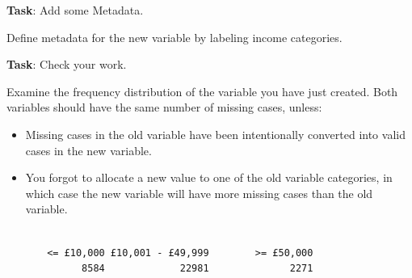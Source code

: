 \documentclass[
  letterpaper,
  DIV=11,
  numbers=noendperiod]{scrreprt}
\newenvironment{Shaded}{\begin{snugshade}}{\end{snugshade}}
\newcommand{\AttributeTok}[1]{\textcolor[rgb]{0.40,0.45,0.13}{#1}}
\newcommand{\CommentTok}[1]{\textcolor[rgb]{0.37,0.37,0.37}{#1}}
\newcommand{\FunctionTok}[1]{\textcolor[rgb]{0.28,0.35,0.67}{#1}}
\newcommand{\NormalTok}[1]{\textcolor[rgb]{0.00,0.23,0.31}{#1}}
\newcommand{\OtherTok}[1]{\textcolor[rgb]{0.00,0.23,0.31}{#1}}
\newcommand{\SpecialCharTok}[1]{\textcolor[rgb]{0.37,0.37,0.37}{#1}}
\newcommand{\StringTok}[1]{\textcolor[rgb]{0.13,0.47,0.30}{#1}}
\providecommand{\tightlist}{%
  \setlength{\itemsep}{0pt}\setlength{\parskip}{0pt}}
\begin{document}
\textbf{Task}: Add some Metadata.

Define metadata for the new variable by labeling income categories.

\begin{Shaded}
\end{Shaded}

\textbf{Task}: Check your work.

Examine the frequency distribution of the variable you have just
created. Both variables should have the same number of missing cases,
unless:

\begin{itemize}
\tightlist
\item
  Missing cases in the old variable have been intentionally converted
  into valid cases in the new variable.
\item
  You forgot to allocate a new value to one of the old variable
  categories, in which case the new variable will have more missing
  cases than the old variable.
\end{itemize}

\begin{Shaded}
\end{Shaded}

\begin{verbatim}

       <= £10,000 £10,001 - £49,999        >= £50,000 
             8584             22981              2271 
\end{verbatim}
\end{document}
